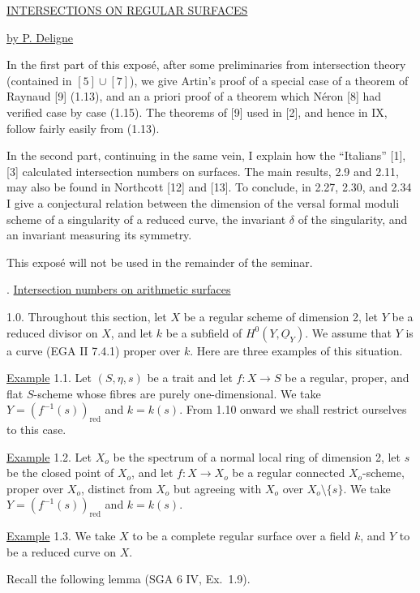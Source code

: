 
\begin{center}
\underline{\underline{INTERSECTIONS ON REGULAR SURFACES}}

\medskip
\underline{by P. Deligne}
\end{center}

In the first part of this exposé, after some preliminaries from intersection theory
(contained in $[5]\cup[7]$), we give Artin's proof of a special case of a theorem of
Raynaud [9] (1.13), and an a priori proof of a theorem which Néron [8] had verified
case by case (1.15).  The theorems of [9] used in [2], and hence in IX, follow fairly
easily from (1.13).

In the second part, continuing in the same vein, I explain how the ``Italians'' [1],
[3] calculated intersection numbers on surfaces.  The main results, 2.9 and 2.11,
may also be found in Northcott [12] and [13].  To conclude, in 2.27, 2.30, and 2.34
I give a conjectural relation between the dimension of the versal formal moduli
scheme of a singularity of a reduced curve, the invariant $\delta$ of the singularity,
and an invariant measuring its symmetry.

This exposé will not be used in the remainder of the seminar.

. \underline{Intersection numbers on arithmetic surfaces}

1.0. Throughout this section, let $X$ be a regular scheme of dimension 2, let $Y$ be
a reduced divisor on $X$, and let $k$ be a subfield of
$H^0(Y,\underline{O}_Y)$.  We assume that $Y$ is a curve (EGA II 7.4.1) proper over
$k$.  Here are three examples of this situation.

\underline{Example} 1.1. Let $(S,\eta,s)$ be a trait and let
$f:X\longrightarrow S$ be a regular, proper, and flat $S$-scheme whose fibres are
purely one-dimensional.  We take $Y=(f^{-1}(s))_{\mathrm{red}}$ and $k=k(s)$.  From
1.10 onward we shall restrict ourselves to this case.


\underline{Example} 1.2. Let $X_o$ be the spectrum of a normal local ring of
dimension 2, let $s$ be the closed point of $X_o$, and let
$f:X\longrightarrow X_o$ be a regular connected $X_o$-scheme, proper over $X_o$,
distinct from $X_o$ but agreeing with $X_o$ over $X_o\setminus\{s\}$.  We take
$Y=(f^{-1}(s))_{\mathrm{red}}$ and $k=k(s)$.

\underline{Example} 1.3. We take $X$ to be a complete regular surface over a field
$k$, and $Y$ to be a reduced curve on $X$.

Recall the following lemma (SGA 6 IV, Ex.~1.9).

